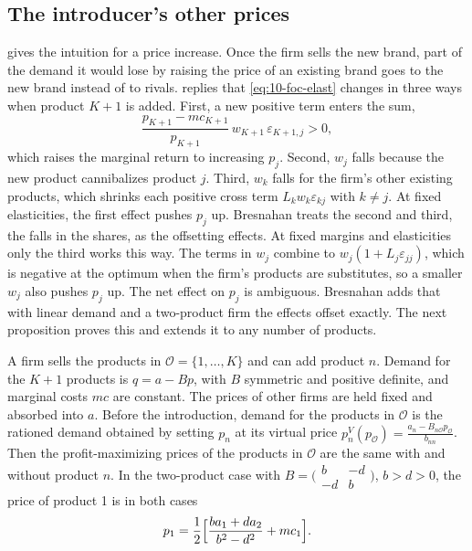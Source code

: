 \subsection{The introducer's other prices}\label{sec:10-own-prices}

\citet[p.~231]{Hausman1997} gives the intuition for a price increase. Once the firm sells the new brand, part of
the demand it would lose by raising the price of an existing brand goes to the new brand instead of to rivals.
\citet[pp.~244--245]{Bresnahan1997} replies that \eqref{eq:10-foc-elast} changes in three ways when product
$K+1$ is added. First, a new positive term enters the sum,
\begin{equation*}
  \frac{p_{K+1} - mc_{K+1}}{p_{K+1}}\,w_{K+1}\,\varepsilon_{K+1,j} > 0,
\end{equation*}
which raises the marginal return to increasing $p_j$. Second, $w_j$ falls because the new product cannibalizes
product $j$. Third, $w_k$ falls for the firm's other existing products, which shrinks each positive cross term
$L_kw_k\varepsilon_{kj}$ with $k\neq j$. At fixed elasticities, the first effect pushes $p_j$ up. Bresnahan
treats the second and third, the falls in the shares, as the offsetting effects. At fixed margins and
elasticities only the third works this way. The terms in $w_j$ combine to $w_j(1 + L_j\varepsilon_{jj})$, which
is negative at the optimum when the firm's products are substitutes, so a smaller $w_j$ also pushes $p_j$ up.
The net effect on $p_j$ is ambiguous. Bresnahan adds that with linear demand and a two-product firm the effects offset exactly. The next
proposition proves this and extends it to any number of products.

\begin{proposition}\label{prop:10-linear-offset}
A firm sells the products in $\mathcal{O} = \{1,\dots,K\}$ and can add product $n$. Demand for the $K+1$
products is $q = a - Bp$, with $B$ symmetric and positive definite, and marginal costs $mc$ are constant. The
prices of other firms are held fixed and absorbed into $a$. Before the introduction, demand for the products
in $\mathcal{O}$ is the rationed demand obtained by setting $p_n$ at its virtual price
$p_n^V(p_{\mathcal{O}}) = \frac{a_n - B_{n\mathcal{O}}p_{\mathcal{O}}}{b_{nn}}$. Then the profit-maximizing
prices of the products in $\mathcal{O}$ are the same with and without product $n$. In the two-product case
with $B = \bigl(\begin{smallmatrix} b & -d\\ -d & b\end{smallmatrix}\bigr)$, $b > d > 0$, the price of product
1 is in both cases
\begin{equation}\label{eq:10-linear-p1}
  p_1 = \frac{1}{2}\Bigl[\frac{ba_1 + da_2}{b^2 - d^2} + mc_1\Bigr].
\end{equation}
\end{proposition}

